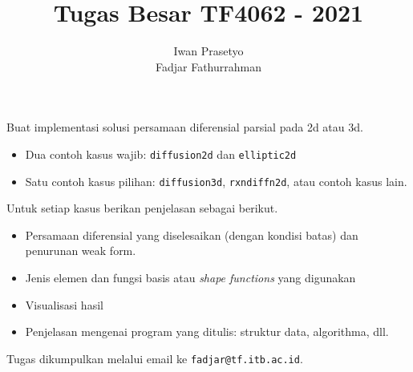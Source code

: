\documentclass[a4paper,12pt]{article} %
\newcommand{\txtinline}[1]{\texttt{#1}}
\begin{document}
\title{Tugas Besar TF4062 - 2021}
\author{Iwan Prasetyo \\
Fadjar Fathurrahman}
\date{}
\maketitle


Buat implementasi solusi persamaan diferensial parsial pada 2d atau 3d.
\begin{itemize}
\item Dua contoh kasus wajib: \txtinline{diffusion2d} dan \txtinline{elliptic2d}
\item Satu contoh kasus pilihan: \txtinline{diffusion3d}, \txtinline{rxndiffn2d}, atau
contoh kasus lain.
\end{itemize}

Untuk setiap kasus berikan penjelasan sebagai berikut.
\begin{itemize}
\item Persamaan diferensial yang diselesaikan (dengan kondisi batas) dan penurunan
weak form.
\item Jenis elemen dan fungsi basis atau \textit{shape functions} yang digunakan
\item Visualisasi hasil
\item Penjelasan mengenai program yang ditulis: struktur data, algorithma, dll.
\end{itemize}

Tugas dikumpulkan melalui email ke \texttt{fadjar@tf.itb.ac.id}.
\end{document}
